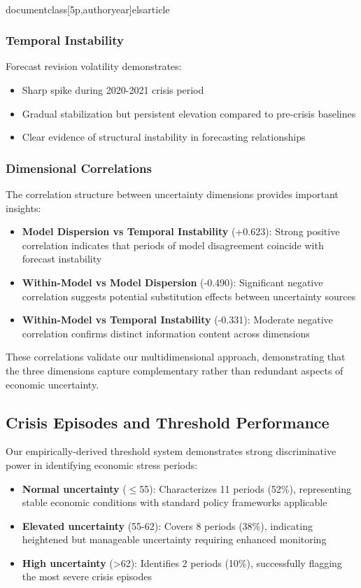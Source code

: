 \\documentclass[5p,authoryear]{elsarticle}
\begin{document}
{\subsubsection{Temporal Instability}
Forecast revision volatility demonstrates:
\begin{itemize}
    \item Sharp spike during 2020-2021 crisis period
    \item Gradual stabilization but persistent elevation compared to pre-crisis baselines
    \item Clear evidence of structural instability in forecasting relationships
\end{itemize}

\subsubsection{Dimensional Correlations}
The correlation structure between uncertainty dimensions provides important insights:

\begin{itemize}
    \item \textbf{Model Dispersion vs Temporal Instability} (+0.623): Strong positive correlation indicates that periods of model disagreement coincide with forecast instability
    \item \textbf{Within-Model vs Model Dispersion} (-0.490): Significant negative correlation suggests potential substitution effects between uncertainty sources
    \item \textbf{Within-Model vs Temporal Instability} (-0.331): Moderate negative correlation confirms distinct information content across dimensions
\end{itemize}

These correlations validate our multidimensional approach, demonstrating that the three dimensions capture complementary rather than redundant aspects of economic uncertainty.

\subsection{Crisis Episodes and Threshold Performance}

Our empirically-derived threshold system demonstrates strong discriminative power in identifying economic stress periods:

\begin{itemize}
    \item \textbf{Normal uncertainty} ($\leq$55): Characterizes 11 periods (52\%), representing stable economic conditions with standard policy frameworks applicable
    \item \textbf{Elevated uncertainty} (55-62): Covers 8 periods (38\%), indicating heightened but manageable uncertainty requiring enhanced monitoring
    \item \textbf{High uncertainty} (>62): Identifies 2 periods (10\%), successfully flagging the most severe crisis episodes
\end{itemize}

}
\end{document}
